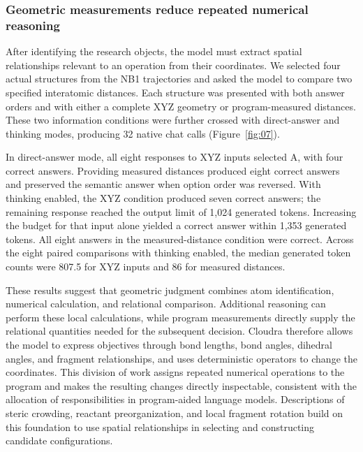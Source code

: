 \subsubsection{Geometric measurements reduce repeated numerical reasoning}

After identifying the research objects, the model must extract spatial relationships relevant to an operation from their coordinates. We selected four actual structures from the NB1 trajectories and asked the model to compare two specified interatomic distances. Each structure was presented with both answer orders and with either a complete XYZ geometry or program-measured distances. These two information conditions were further crossed with direct-answer and thinking modes, producing 32 native chat calls (Figure~\ref{fig:07}).

In direct-answer mode, all eight responses to XYZ inputs selected A, with four correct answers. Providing measured distances produced eight correct answers and preserved the semantic answer when option order was reversed. With thinking enabled, the XYZ condition produced seven correct answers; the remaining response reached the output limit of 1,024 generated tokens. Increasing the budget for that input alone yielded a correct answer within 1,353 generated tokens. 
\newpage
\noindent
All eight answers in the measured-distance condition were correct. Across the eight paired comparisons with thinking enabled, the median generated token counts were 807.5 for XYZ inputs and 86 for measured distances.

These results suggest that geometric judgment combines atom identification, numerical calculation, and relational comparison. Additional reasoning can perform these local calculations, while program measurements directly supply the relational quantities needed for the subsequent decision. Cloudra therefore allows the model to express objectives through bond lengths, bond angles, dihedral angles, and fragment relationships, and uses deterministic operators to change the coordinates. This division of work assigns repeated numerical operations to the program and makes the resulting changes directly inspectable, consistent with the allocation of responsibilities in program-aided language models.\citep{ref15} Descriptions of steric crowding, reactant preorganization, and local fragment rotation build on this foundation to use spatial relationships in selecting and constructing candidate configurations.

